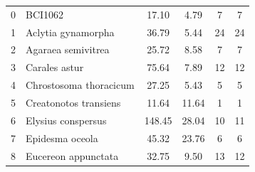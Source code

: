 \documentclass[12pt,a4paper,pdftex]{article}
\begin{document}
\begin{table}[h]
\begin{tabular}{llcccc}
		0            & BCI1062                            & 17.10                                                & 4.79                                            & 7                                                         & 7                                                          \\
		1            & Aclytia gynamorpha          & 36.79                                                & 5.44                                            & 24                                                        & 24                                                         \\
		2            & Agaraea semivitrea          & 25.72                                                & 8.58                                            & 7                                                         & 7                                                          \\
		3            & Carales astur              & 75.64                                                & 7.89                                            & 12                                                        & 12                                                         \\
		4            & Chrostosoma thoracicum       & 27.25                                                & 5.43                                            & 5                                                         & 5                                                          \\
		5            & Creatonotos transiens                  & 11.64                                                & 11.64                                           & 1                                                         & 1                                                          \\
		6            & Elysius conspersus           & 148.45                                               & 28.04                                           & 10                                                        & 11                                                         \\
		7            & Epidesma oceola              & 45.32                                                & 23.76                                           & 6                                                         & 6                                                          \\
		8            & Eucereon appunctata          & 32.75                                                & 9.50                                            & 13                                                        & 12                                                         \\

\end{tabular}
\end{table}
\end{document}

